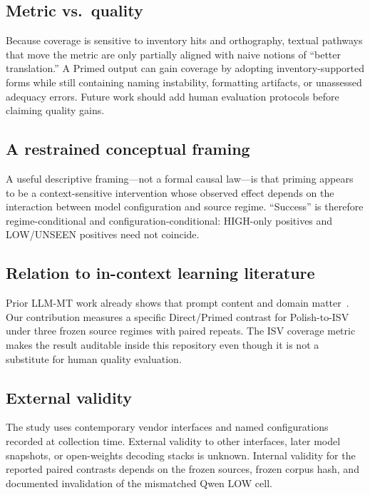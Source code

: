 \subsection{Metric vs.\ quality}
Because coverage is sensitive to inventory hits and orthography, textual pathways that move the metric are only partially aligned with naive notions of ``better translation.''
A Primed output can gain coverage by adopting inventory-supported forms while still containing naming instability, formatting artifacts, or unassessed adequacy errors.
Future work should add human evaluation protocols before claiming quality gains.

\subsection{A restrained conceptual framing}
A useful descriptive framing---not a formal causal law---is that priming appears to be a context-sensitive intervention whose observed effect depends on the interaction between model configuration and source regime.
``Success'' is therefore regime-conditional and configuration-conditional: HIGH-only positives and LOW/UNSEEN positives need not coincide.

\subsection{Relation to in-context learning literature}
Prior LLM-MT work already shows that prompt content and domain matter~\citep{hendy2023good,moslem2023adaptive,zhu2023multilingual}.
Our contribution measures a specific Direct/Primed contrast for Polish-to-ISV under three frozen source regimes with paired repeats.
The ISV coverage metric makes the result auditable inside this repository even though it is not a substitute for human quality evaluation.

\subsection{External validity}
The study uses contemporary vendor interfaces and named configurations recorded at collection time.
External validity to other interfaces, later model snapshots, or open-weights decoding stacks is unknown.
Internal validity for the reported paired contrasts depends on the frozen sources, frozen corpus hash, and documented invalidation of the mismatched Qwen LOW cell.
